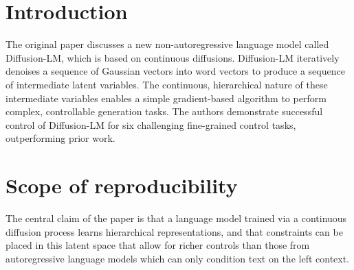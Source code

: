 \section{Introduction}


The original paper discusses a new non-autoregressive language model called Diffusion-LM, which is based on continuous diffusions. Diffusion-LM iteratively denoises a sequence of Gaussian vectors into word vectors to produce a sequence of intermediate latent variables. The continuous, hierarchical nature of these intermediate variables enables a simple gradient-based algorithm to perform complex, controllable generation tasks. The authors demonstrate successful control of Diffusion-LM for six challenging fine-grained control tasks, outperforming prior work.

\section{Scope of reproducibility}
\label{sec:claims}



The central claim of the paper is that a language model trained via a continuous diffusion process learns hierarchical representations, and that constraints can be placed in this latent space that allow for richer controls than those from autoregressive language models which can only condition text on the left context.

